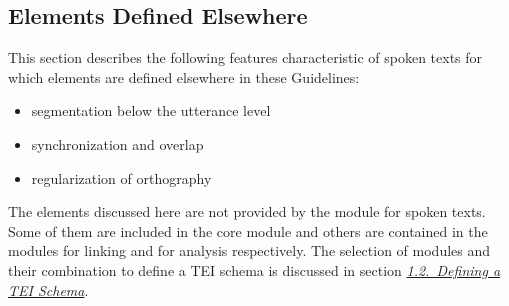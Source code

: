 \subsection[{Elements Defined Elsewhere}]{Elements Defined Elsewhere}\label{TSSA}\par
This section describes the following features characteristic of spoken texts for which elements are defined elsewhere in these Guidelines: \begin{itemize}
\item segmentation below the utterance level
\item synchronization and overlap
\item regularization of orthography
\end{itemize}  The elements discussed here are not provided by the module for spoken texts. Some of them are included in the core module and others are contained in the modules for linking and for analysis respectively. The selection of modules and their combination to define a TEI schema is discussed in section \textit{\hyperref[STIN]{1.2.\ Defining a TEI Schema}}. 
